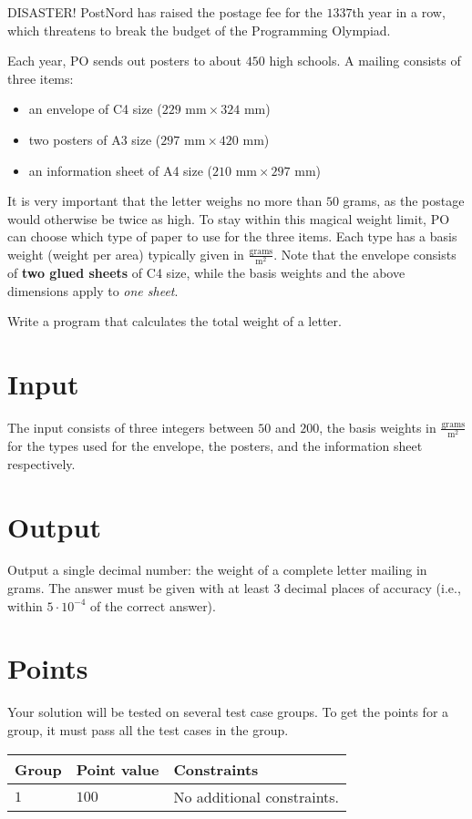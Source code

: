 \noindent
DISASTER!
PostNord has raised the postage fee for the $1337$th year in a row, which threatens to break the budget of the Programming Olympiad.

Each year, PO sends out posters to about $450$ high schools.
A mailing consists of three items:
\begin{itemize}
\item an envelope of C4 size ($229\text{ mm} \times 324\text{ mm}$)
\item two posters of A3 size ($297\text{ mm} \times 420\text{ mm}$)
\item an information sheet of A4 size ($210\text{ mm} \times 297\text{ mm}$)
\end{itemize}

It is very important that the letter weighs no more than $50$ grams, as the postage would otherwise be twice as high.
To stay within this magical weight limit, PO can choose which type of paper to use for the three items.
Each type has a basis weight (weight per area) typically given in $\frac{\text{grams}}{\text{m}^2}$.
Note that the envelope consists of \textbf{two glued sheets} of C4 size, while the basis weights and the above dimensions apply to \emph{one sheet}.

Write a program that calculates the total weight of a letter.

\section*{Input}
The input consists of three integers between $50$ and $200$, the basis weights in $\frac{\text{grams}}{\text{m}^2}$ for the types used for the envelope, the posters, and the information sheet respectively.

\section*{Output}
Output a single decimal number: the weight of a complete letter mailing in grams.
The answer must be given with at least $3$ decimal places of accuracy (i.e., within $5 \cdot 10^{-4}$ of the correct answer).

\section*{Points}
Your solution will be tested on several test case groups.
To get the points for a group, it must pass all the test cases in the group.

\noindent
\begin{tabular}{| l | l | p{12cm} |}
  \hline
  \textbf{Group} & \textbf{Point value} & \textbf{Constraints} \\ \hline
  $1$    & $100$     & No additional constraints. \\ \hline
\end{tabular}